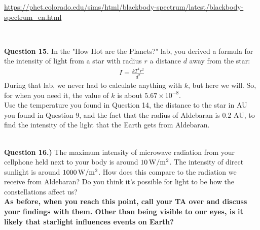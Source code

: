 \documentclass[11pt]{article}
\begin{document}
\begin{center}\small
	\url{https://phet.colorado.edu/sims/html/blackbody-spectrum/latest/blackbody-spectrum_en.html}
\end{center}

\vspace{1.5cm}
\hrulefill\\

\vspace{1em}



\textbf{Question 15.} In the "How Hot are the Planets?" lab, you derived a formula for the intensity of light from a star with radius $r$ a distance $d$ away from the star:
\begin{align*}
I=\frac{k T^4r^2}{d^2}
\end{align*} 
During that lab, we never had to calculate anything with $k$, but here we will. So, for when you need it, the value of $k$ is about $5.67\times 10^{-8}$.\\

Use the temperature you found in Question 14, the distance to the star in AU you found in Question 9, and the fact that the radius of Aldebaran is 0.2 AU, to find the intensity of the light that the Earth gets from Aldebaran.\\
\vfill
\hrulefill\\

\vspace{1em}


\newpage

\textbf{Question 16.)} The maximum intensity of microwave radiation from your cellphone held next to your body is around $10 \rm\, W/m^2$. The intensity of direct sunlight is around $1000 \rm \, W/m^2$. How does this compare to the radiation we receive from Aldebaran? Do you think it's possible for light to be how the constellations affect us?\\

{\bf As before, when you reach this point, call your TA over and discuss your findings with them. Other than being visible to our eyes, is it likely that starlight influences events on Earth?}

\vspace{1.5cm}
\hrulefill\\
\end{document}

